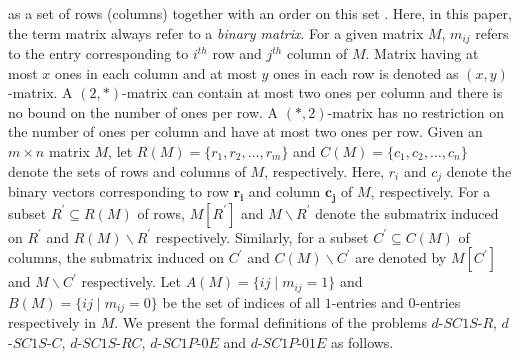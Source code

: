 \documentclass[review, 1p]{elsarticle}
\renewcommand{\vec}[1]{\mathbf{#1}}
\begin{document}
as a set of rows (columns) together with an order on this set \cite{dom2009recognition}. Here, in this paper, the term matrix always refer to a \textit{binary matrix}. For a given matrix $M$, $m_{ij}$ refers to the entry corresponding to $i^{th}$ row and $j^{th}$ column of $M$. Matrix having at most $x$ ones in each column and at most $y$ ones in each row is denoted as $(x,y)$-matrix. A $(2,*)$-matrix can contain at most two ones per column and there is no bound on the number of ones per row. A $(*,2)$-matrix has no restriction on the number of ones per column and have at most two ones per row. Given an $m \times n$ matrix $M$, let $R(M)=\lbrace r_{1}, r_{2}, \ldots, r_{m} \rbrace$ and $C(M)=\lbrace c_{1}, c_{2}, \ldots, c_{n} \rbrace$ denote the sets of rows and columns of $M$, respectively. Here, $r_{i}$ and $c_{j}$  denote the binary vectors corresponding to row $\vec{r_{i}}$ and column $\vec{c_{j}}$ of $M$, respectively.  For a subset $R^{'} \subseteq R(M)$ of rows, $M[R^{'}]$ and $M \backslash R^{'}$ denote the submatrix induced on $R^{'}$ and $R(M) \backslash R^{'}$ respectively. Similarly, for a subset $C^{'} \subseteq C(M)$ of columns, the submatrix induced on $C^{'}$ and $C(M) \backslash C^{'}$ are denoted by $M[C^{'}]$ and $M \backslash C^{'}$ respectively. Let $A(M)= \lbrace ij \mid m_{ij}=1 \rbrace$  and $B(M)= \lbrace ij \mid m_{ij}=0 \rbrace$ be the set of indices of all $1$-entries and $0$-entries respectively in $M$. We present the formal definitions of the problems $d$-$SC1S$-$R$, $d$-$SC1S$-$C$, $d$-$SC1S$-$RC$, $d$-$SC1P$-$0E$ and $d$-$SC1P$-$01E$ as follows.\\\\
\noindent{}
\end{document}
